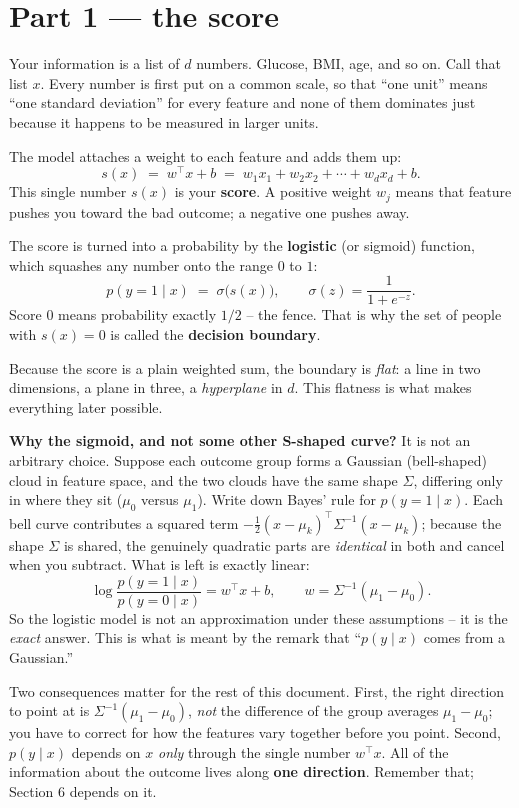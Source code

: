 \documentclass[11pt]{article}
\begin{document}
\section{Part 1 --- the score}

Your information is a list of $d$ numbers. Glucose, BMI, age, and so on. Call that
list $x$. Every number is first put on a common scale, so that ``one unit'' means
``one standard deviation'' for every feature and none of them dominates just because
it happens to be measured in larger units.

The model attaches a weight to each feature and adds them up:
\[
  s(x) \;=\; w^\top x + b \;=\; w_1 x_1 + w_2 x_2 + \cdots + w_d x_d + b .
\]
This single number $s(x)$ is your \textbf{score}. A positive weight $w_j$ means that
feature pushes you toward the bad outcome; a negative one pushes away.

The score is turned into a probability by the \textbf{logistic} (or sigmoid) function,
which squashes any number onto the range $0$ to $1$:
\[
  p(y = 1 \mid x) \;=\; \sigma\big(s(x)\big), \qquad
  \sigma(z) = \frac{1}{1 + e^{-z}} .
\]
Score $0$ means probability exactly $1/2$ -- the fence. That is why the set of people
with $s(x) = 0$ is called the \textbf{decision boundary}.

Because the score is a plain weighted sum, the boundary is \emph{flat}: a line in two
dimensions, a plane in three, a \emph{hyperplane} in $d$. This flatness is what makes
everything later possible.

\begin{keybox}
\textbf{Why the sigmoid, and not some other S-shaped curve?}
It is not an arbitrary choice. Suppose each outcome group forms a Gaussian (bell-shaped)
cloud in feature space, and the two clouds have the same shape $\Sigma$, differing only
in where they sit ($\mu_0$ versus $\mu_1$). Write down Bayes' rule for
$p(y{=}1 \mid x)$. Each bell curve contributes a squared term
$-\tfrac12 (x - \mu_k)^\top \Sigma^{-1} (x - \mu_k)$; because the shape $\Sigma$ is
shared, the genuinely quadratic parts are \emph{identical} in both and cancel when you
subtract. What is left is exactly linear:
\[
  \log \frac{p(y{=}1 \mid x)}{p(y{=}0\mid x)} = w^\top x + b,
  \qquad w = \Sigma^{-1}(\mu_1 - \mu_0).
\]
So the logistic model is not an approximation under these assumptions -- it is the
\emph{exact} answer. This is what is meant by the remark that ``$p(y \mid x)$ comes
from a Gaussian.''

Two consequences matter for the rest of this document. First, the right direction to
point at is $\Sigma^{-1}(\mu_1 - \mu_0)$, \emph{not} the difference of the group
averages $\mu_1 - \mu_0$; you have to correct for how the features vary together
before you point. Second, $p(y\mid x)$ depends on $x$ \emph{only} through the single
number $w^\top x$. All of the information about the outcome lives along \textbf{one
direction}. Remember that; Section 6 depends on it.
\end{keybox}
\end{document}
